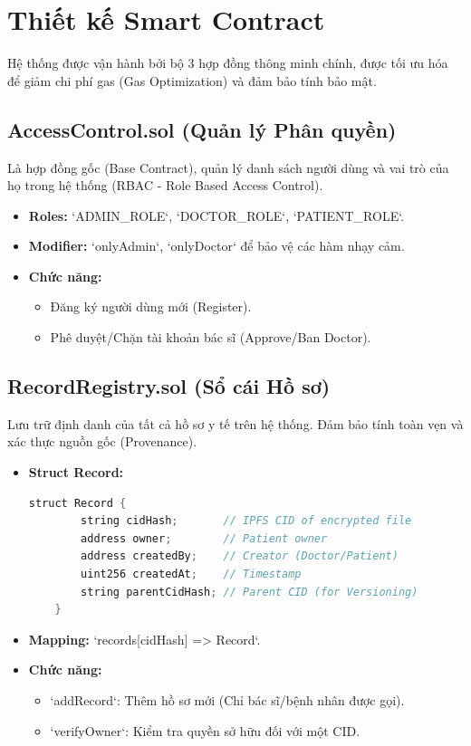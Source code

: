 \documentclass[12pt,a4paper]{report}
\begin{document}
\section{Thiết kế Smart Contract}
Hệ thống được vận hành bởi bộ 3 hợp đồng thông minh chính, được tối ưu hóa để giảm chi phí gas (Gas Optimization) và đảm bảo tính bảo mật.

\subsection{AccessControl.sol (Quản lý Phân quyền)}
Là hợp đồng gốc (Base Contract), quản lý danh sách người dùng và vai trò của họ trong hệ thống (RBAC - Role Based Access Control).
\begin{itemize}
    \item \textbf{Roles:} `ADMIN_ROLE`, `DOCTOR_ROLE`, `PATIENT_ROLE`.
    \item \textbf{Modifier:} `onlyAdmin`, `onlyDoctor` để bảo vệ các hàm nhạy cảm.
    \item \textbf{Chức năng:}
    \begin{itemize}
        \item Đăng ký người dùng mới (Register).
        \item Phê duyệt/Chặn tài khoản bác sĩ (Approve/Ban Doctor).
    \end{itemize}
\end{itemize}

\subsection{RecordRegistry.sol (Sổ cái Hồ sơ)}
Lưu trữ định danh của tất cả hồ sơ y tế trên hệ thống. Đảm bảo tính toàn vẹn và xác thực nguồn gốc (Provenance).
\begin{itemize}
    \item \textbf{Struct Record:}
    \begin{lstlisting}[language=Java]
    struct Record {
        string cidHash;       // IPFS CID of encrypted file
        address owner;        // Patient owner
        address createdBy;    // Creator (Doctor/Patient)
        uint256 createdAt;    // Timestamp
        string parentCidHash; // Parent CID (for Versioning)
    }
    \end{lstlisting}
    \item \textbf{Mapping:} `records[cidHash] => Record`.
    \item \textbf{Chức năng:}
    \begin{itemize}
        \item `addRecord`: Thêm hồ sơ mới (Chỉ bác sĩ/bệnh nhân được gọi).
        \item `verifyOwner`: Kiểm tra quyền sở hữu đối với một CID.
    \end{itemize}
\end{itemize}
\end{document}
